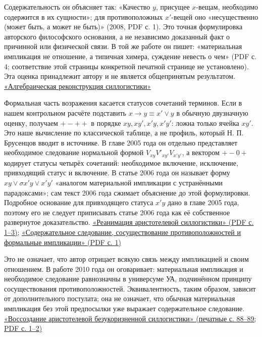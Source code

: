 \documentclass[12pt,a4paper]{article}
\begin{document}
Содержательность он объясняет так: «Качество \(y\), присущее \(x\)-вещам, необходимо содержится в их сущности»; для противоположных \(x'\)-вещей оно «несущественно (может быть, а может не быть)» (2008, PDF с. 1). Это точная формулировка авторского философского основания, а не независимо доказанный факт о причинной или физической связи. В той же работе он пишет: «материальная импликация не отношение, а типичная химера, суждение невесть о чем» (PDF с. 4; соответствие этой страницы конкретной печатной странице не установлено). Эта оценка принадлежит автору и не является общепринятым результатом. \href{https://ternarycomp.cs.msu.ru/Papers/Alrek.pdf}{«Алгебраическая реконструкция силлогистики»}

Формальная часть возражения касается статусов сочетаний терминов. Если в нашем контрольном расчёте подставить \(x\to y\equiv x'\lor y\) в обычную двузначную оценку, получаем \(+-++\) в порядке \(xy,xy',x'y,x'y'\): ложна только ячейка \(xy'\). Это наше вычисление по классической таблице, а не профиль, который Н. П. Брусенцов вводит в источнике. В главе 2005 года он отдельно представляет необходимое следование нормальной формой \(V_{xy}V'_{xy'}V_{x'y'}\), а вектором \(+-0+\) кодирует статусы четырёх сочетаний: необходимое включение, исключение, привходящий статус и включение. В статье 2006 года он называет форму \(xy\lor\sigma x'y\lor x'y'\) «аналогом материальной импликации с устранёнными парадоксами»; сам текст 2006 года сжимает объяснение до этой формулировки. Подробное основание для привходящего статуса \(x'y\) дано в главе 2005 года, поэтому его не следует приписывать статье 2006 года как её собственное развернутое доказательство. \href{https://ternarycomp.cs.msu.ru/Papers/Rea.pdf}{«Реанимация аристотелевой силлогистики» (PDF с. 1–3)}; \href{https://ternarycomp.cs.msu.ru/Papers/Soder_sled.pdf}{«Содержательное следование, сосуществование противоположностей и формальные импликации» (PDF с. 1)}

Это не означает, что автор отрицает всякую связь между импликацией и своим отношением. В работе 2010 года он оговаривает: материальная импликация и необходимое следование равнозначны в универсуме \(\text{УА}\), подчинённом принципу сосуществования противоположностей. Эквивалентность, таким образом, зависит от дополнительного постулата; она не означает, что обычная материальная импликация без этой предпосылки уже выражает содержательное следование. \href{https://ternarycomp.cs.msu.ru/Papers/brusentsov_sborn2010_2.pdf}{«Воссоздание аристотелевой безукоризненной силлогистики» (печатные с. 88–89; PDF с. 1–2)}
\end{document}
